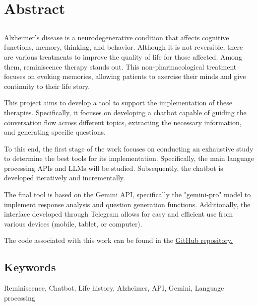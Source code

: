 \chapter*{Abstract}
\section*{\tituloPortadaVal}
Alzheimer's disease is a neurodegenerative condition that affects cognitive functions, memory, thinking, and behavior. Although it is not reversible, there are various treatments to improve the quality of life for those affected. Among them, reminiscence therapy stands out. This non-pharmacological treatment focuses on evoking memories, allowing patients to exercise their minds and give continuity to their life story.

This project aims to develop a tool to support the implementation of these therapies. Specifically, it focuses on developing a chatbot capable of guiding the conversation flow across different topics, extracting the necessary information, and generating specific questions.

To this end, the first stage of the work focuses on conducting an exhaustive study to determine the best tools for its implementation. Specifically, the main language processing APIs and LLMs will be studied. Subsequently, the chatbot is developed iteratively and incrementally.

The final tool is based on the Gemini API, specifically the "gemini-pro" model to implement response analysis and question generation functions. Additionally, the interface developed through Telegram allows for easy and efficient use from various devices (mobile, tablet, or computer).

The code associated with this work can be found in the \href{https://github.com/mavice07/TFG-ChatBotCantor.git}{GitHub repository.}

\section*{Keywords}

\noindent Reminiscence, Chatbot, Life history, Alzheimer, API, Gemini, Language processing



